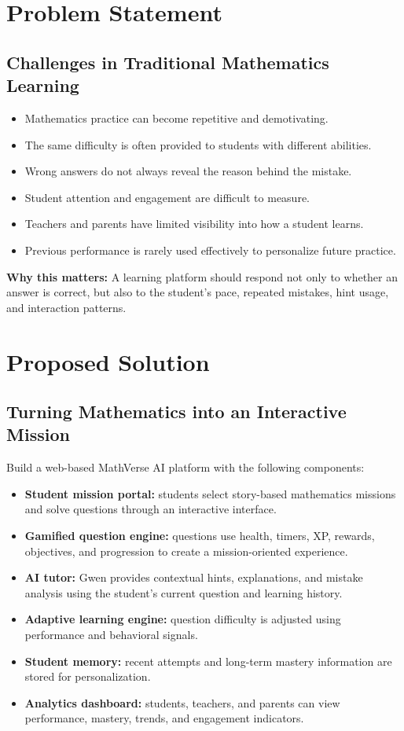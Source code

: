 \documentclass[11pt]{article}
\begin{document}
\section{Problem Statement}
\subsection*{Challenges in Traditional Mathematics Learning}
\begin{itemize}
    \item Mathematics practice can become repetitive and demotivating.
    \item The same difficulty is often provided to students with different abilities.
    \item Wrong answers do not always reveal the reason behind the mistake.
    \item Student attention and engagement are difficult to measure.
    \item Teachers and parents have limited visibility into how a student learns.
    \item Previous performance is rarely used effectively to personalize future practice.
\end{itemize}

\noindent\textbf{Why this matters:} A learning platform should respond not only to whether an answer is correct, but also to the student's pace, repeated mistakes, hint usage, and interaction patterns.

\section{Proposed Solution}
\subsection*{Turning Mathematics into an Interactive Mission}
Build a web-based MathVerse AI platform with the following components:
\begin{itemize}
    \item \textbf{Student mission portal:} students select story-based mathematics missions and solve questions through an interactive interface.
    \item \textbf{Gamified question engine:} questions use health, timers, XP, rewards, objectives, and progression to create a mission-oriented experience.
    \item \textbf{AI tutor:} Gwen provides contextual hints, explanations, and mistake analysis using the student's current question and learning history.
    \item \textbf{Adaptive learning engine:} question difficulty is adjusted using performance and behavioral signals.
    \item \textbf{Student memory:} recent attempts and long-term mastery information are stored for personalization.
    \item \textbf{Analytics dashboard:} students, teachers, and parents can view performance, mastery, trends, and engagement indicators.
\end{itemize}
\end{document}
